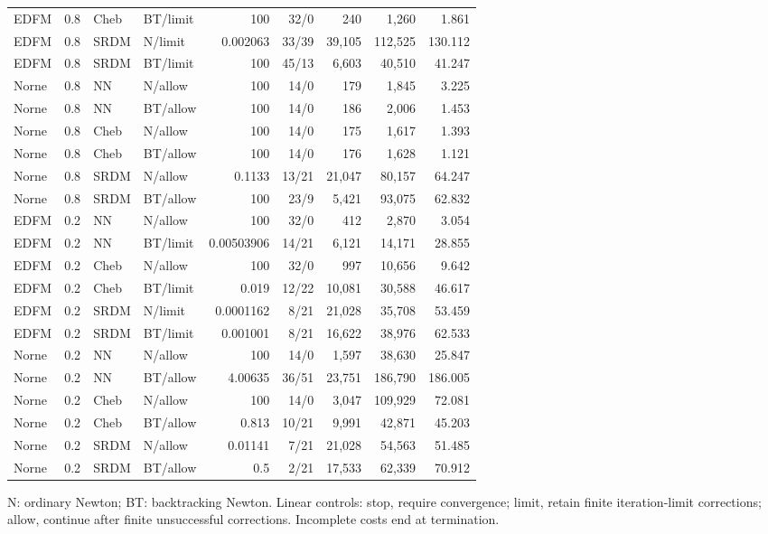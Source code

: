 {\begin{longtable}{lrllrrrrr}
EDFM & 0.8 & Cheb & BT/limit & 100 & 32/0 & 240 & 1,260 & 1.861 \\
EDFM & 0.8 & SRDM & N/limit & 0.002063 & 33/39 & 39,105 & 112,525 & 130.112 \\
EDFM & 0.8 & SRDM & BT/limit & 100 & 45/13 & 6,603 & 40,510 & 41.247 \\
Norne & 0.8 & NN & N/allow & 100 & 14/0 & 179 & 1,845 & 3.225 \\
Norne & 0.8 & NN & BT/allow & 100 & 14/0 & 186 & 2,006 & 1.453 \\
Norne & 0.8 & Cheb & N/allow & 100 & 14/0 & 175 & 1,617 & 1.393 \\
Norne & 0.8 & Cheb & BT/allow & 100 & 14/0 & 176 & 1,628 & 1.121 \\
Norne & 0.8 & SRDM & N/allow & 0.1133 & 13/21 & 21,047 & 80,157 & 64.247 \\
Norne & 0.8 & SRDM & BT/allow & 100 & 23/9 & 5,421 & 93,075 & 62.832 \\
EDFM & 0.2 & NN & N/allow & 100 & 32/0 & 412 & 2,870 & 3.054 \\
EDFM & 0.2 & NN & BT/limit & 0.00503906 & 14/21 & 6,121 & 14,171 & 28.855 \\
EDFM & 0.2 & Cheb & N/allow & 100 & 32/0 & 997 & 10,656 & 9.642 \\
EDFM & 0.2 & Cheb & BT/limit & 0.019 & 12/22 & 10,081 & 30,588 & 46.617 \\
EDFM & 0.2 & SRDM & N/limit & 0.0001162 & 8/21 & 21,028 & 35,708 & 53.459 \\
EDFM & 0.2 & SRDM & BT/limit & 0.001001 & 8/21 & 16,622 & 38,976 & 62.533 \\
Norne & 0.2 & NN & N/allow & 100 & 14/0 & 1,597 & 38,630 & 25.847 \\
Norne & 0.2 & NN & BT/allow & 4.00635 & 36/51 & 23,751 & 186,790 & 186.005 \\
Norne & 0.2 & Cheb & N/allow & 100 & 14/0 & 3,047 & 109,929 & 72.081 \\
Norne & 0.2 & Cheb & BT/allow & 0.813 & 10/21 & 9,991 & 42,871 & 45.203 \\
Norne & 0.2 & SRDM & N/allow & 0.01141 & 7/21 & 21,028 & 54,563 & 51.485 \\
Norne & 0.2 & SRDM & BT/allow & 0.5 & 2/21 & 17,533 & 62,339 & 70.912 \\
\end{longtable}
\noindent N: ordinary Newton; BT: backtracking Newton. Linear controls: stop, require convergence; limit, retain finite iteration-limit corrections; allow, continue after finite unsuccessful corrections. Incomplete costs end at termination.\par}
